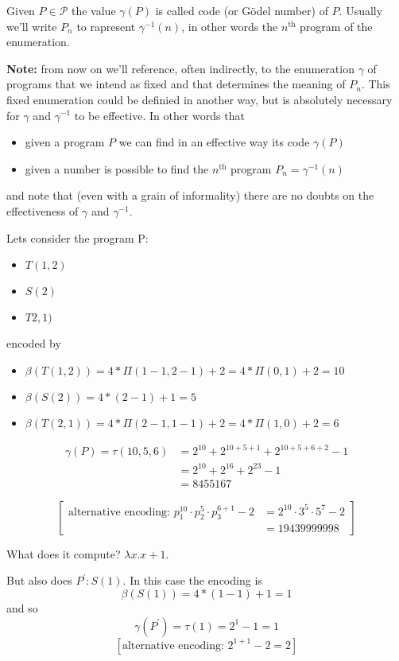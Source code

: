 \begin{definition}
  Given $P \in \mathcal{P}$ the value $\gamma(P)$ is called code (or
  Gödel number) of $P$. Usually we'll write $P_n$ to rapresent
  $\gamma^{-1}(n)$, in other words the $n^{\mbox{th}}$ program of the
  enumeration.
\end{definition}

\textbf{Note:} from now on we'll reference, often indirectly, to the
enumeration $\gamma$ of programs that we intend as fixed and that
determines the meaning of $P_n$.  This fixed enumeration could be
definied in another way, but is absolutely necessary for $\gamma$ and
$\gamma^{-1}$ to be effective. In other words that
\begin{itemize}
\item given a program $P$ we can find in an effective way its code
  $\gamma(P)$
\item given a number is possible to find the $n^{\mbox{th}}$ program
  $P_n = \gamma^{-1}(n)$
\end{itemize}

and note that (even with a grain of informality) there are no doubts
on the effectiveness of $\gamma$ and $\gamma^{-1}$.

\begin{example}
  Lets consider the program P:
  \begin{itemize}
  \item[] $T(1,2)$
  \item[] $S(2)$
  \item[] $T2,1)$
  \end{itemize}
  encoded by

  \begin{itemize}
  \item[] $\beta(T(1,2)) = 4 * \Pi(1-1,2-1) + 2 = 4 * \Pi(0,1) + 2 = 10$
  \item[] $\beta(S(2)) = 4 * (2-1) + 1 = 5$
  \item[] $\beta(T(2,1)) = 4 * \Pi(2-1,1-1) + 2 = 4 * \Pi(1,0) + 2 = 6$
  \end{itemize}

  \[\begin{split}
      \gamma(P) = \tau(10,5,6) & = 2^{10} + 2^{10+5+1} + 2^{10+5+6+2} - 1 \\
      & = 2^{10} + 2^{16} + 2^{23} - 1 \\
      & = 8455167
    \end{split}
  \]

  \[
    \left[
      \begin{split}
        \mbox{alternative encoding: } p_1^{10} \cdot p_2^5 \cdot p_3^{6+1} - 2 & = 2^{10} \cdot 3^5 \cdot 5^7 -2 \\
        & = 19439999998
      \end{split}
    \right]
  \]
  
  What does it compute? $\lambda x . x+1$.

  But also does $P^\prime : S(1)$. In this case the encoding is
  \[\beta(S(1)) = 4 * (1-1) + 1 = 1\] and so
  \[\gamma(P^\prime) = \tau(1) = 2^1 - 1 = 1\]
  \[\left[ \mbox{alternative encoding: } 2^{1+1} - 2 = 2 \right] \]
\end{example}

